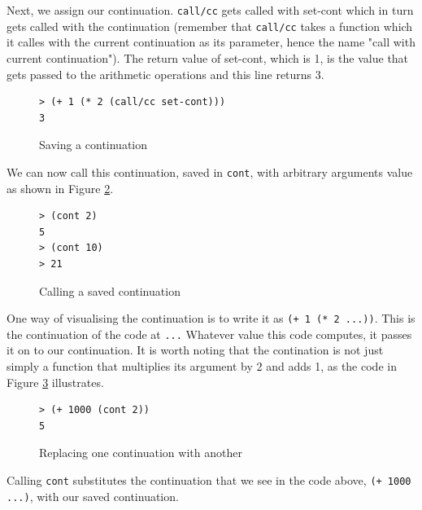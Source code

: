 \documentclass[11pt]{report}
\begin{document}
Next, we assign our continuation. \texttt{call/cc} gets called with set-cont which in turn gets called with the continuation (remember that \texttt{call/cc} takes a function which it calles with the current continuation as its parameter, hence the name "call with current continuation"). The return value of set-cont, which is 1, is the value that gets passed to the arithmetic operations and this line returns 3.
\begin{figure}[ht]
\begin{lstlisting}
> (+ 1 (* 2 (call/cc set-cont)))
3
\end{lstlisting}
\caption{Saving a continuation}
\label{contcc2}
\end{figure}

We can now call this continuation, saved in \texttt{cont}, with arbitrary arguments value as shown in Figure \ref{contcc3}.
\begin{figure}[ht]
\begin{lstlisting}
> (cont 2)
5
> (cont 10)
> 21
\end{lstlisting}
\caption{Calling a saved continuation}
\label{contcc3}
\end{figure}

One way of visualising the continuation is to write it as \texttt{(+ 1 (* 2 ...))}. This is the continuation of the code at \texttt{...} Whatever value this code computes, it passes it on to our continuation. It is worth noting that the contination is not just simply a function that multiplies its argument by 2 and adds 1, as the code in Figure \ref{contcc4} illustrates.
\begin{figure}[ht]
\begin{lstlisting}
> (+ 1000 (cont 2))
5
\end{lstlisting}
\caption{Replacing one continuation with another}
\label{contcc4}
\end{figure}

Calling \texttt{cont} substitutes the continuation that we see in the code above, \texttt{(+ 1000 ...)}, with our saved continuation.
\end{document}
